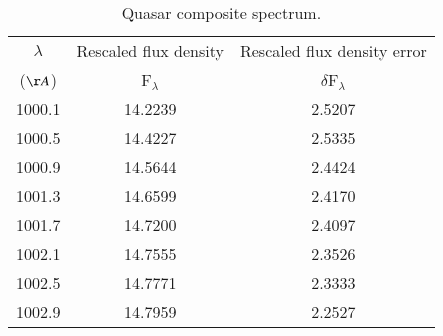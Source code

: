 \begin{table}
\centering
\begin{center}
\caption{Quasar composite spectrum.}
\begin{tabular}{ccc}
\hline
\hline
\noalign{\smallskip}
$\lambda$ &  Rescaled flux density & Rescaled flux density error \\  
(${\AA}$) & F$_{\lambda}$ & $\delta$F$_{\lambda}$ \\
\hline



1000.1 & 14.2239 & 2.5207 \\
1000.5 & 14.4227 & 2.5335 \\
1000.9 & 14.5644 & 2.4424 \\
1001.3 & 14.6599 & 2.4170 \\
1001.7 & 14.7200 & 2.4097 \\
1002.1 & 14.7555 & 2.3526 \\
1002.5 & 14.7771 & 2.3333 \\
1002.9 & 14.7959 & 2.2527 \\




\hline
\hline
\end{tabular}
\end{center}


\end{table}



